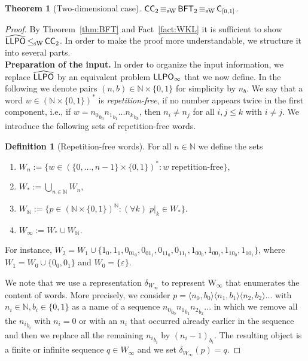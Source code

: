 \documentclass[a4paper]{amsart}
\def\IN{{\mathbb{N}}}
\def\LLPO{\text{\rm\sffamily LLPO}}
\def\BFT{\mbox{\rm\sffamily BFT}}
\def\C{\mbox{\rm\sffamily C}}
\def\ConC{\mbox{\rm\sffamily CC}}
\def\LLPO{\mbox{\rm\sffamily LLPO}}
\def\leqSW{\mathop{\leq_{\mathrm{sW}}}}
\def\equivSW{\mathop{\equiv_{\mathrm{sW}}}}
\newcommand{\W}{\mathrm{W}}
\newtheorem{theorem}{Theorem}[section]
\theoremstyle{definition}
\newtheorem{localdef}[localclaim]{Definition}
\begin{document}
\begin{theorem}[Two-dimensional case]
\label{thm:dim2}
$\ConC_2\equivSW\BFT_2\equivSW\C_{[0,1]}$.
\end{theorem}
\begin{proof}
By Theorem~\ref{thm:BFT} and Fact~\ref{fact:WKL} it is sufficient to show $\widehat{\LLPO}\leqSW\ConC_2$.
In order to make the proof more understandable, we structure it into several parts.\\

\noindent
{\bf Preparation of the input.}
In order to organize the input information, we replace $\widehat{\LLPO}$ by an equivalent problem $\LLPO_\infty$
that we now define.
In the following we denote pairs $(n,b)\in\IN\times\{0,1\}$ for simplicity by $n_b$.
We say that a word $w\in(\IN\times\{0,1\})^*$ is {\em repetition-free}, if 
no number appears twice in the first component, i.e., if $w={n_0}_{b_0}{n_1}_{b_1}...{n_k}_{b_k}$, then 
$n_i\not=n_j$ for all $i,j\leq k$ with $i\not=j$. We introduce the following sets of repetition-free words.
 
\begin{localdef}[Repetition-free words]
For all $n\in\IN$ we define the sets
\begin{enumerate}
\item $W_n:=\{w\in(\{0,...,n-1\}\times\{0,1\})^*:w$ repetition-free$\}$,
\item $W_*:=\bigcup_{n\in\IN}W_n$,
\item $W_\IN:=\{p\in(\IN\times\{0,1\})^\IN:(\forall k)\;p|_k\in W_*\}$.
\item $W_\infty:=W_*\cup W_\IN$.
\end{enumerate}
\end{localdef}

For instance, $W_2=W_1\cup\{1_0,1_1,0_01_0,0_01_1,0_11_0,0_11_1,1_00_0,1_00_1,1_10_0,1_10_1\}$,
where $W_1=W_0\cup\{0_0,0_1\}$ and $W_0=\{\varepsilon\}$. 

We note that we use a representation $\delta_{W_\infty}$ to represent $\W_\infty$ that enumerates
the content of words. More precisely, we consider $p=\langle n_0,b_0\rangle\langle n_1,b_1\rangle\langle n_2,b_2\rangle...$
with $n_i\in\IN, b_i\in\{0,1\}$ as a name of a sequence ${n_0}_{b_0}{n_1}_{b_1}{n_2}_{b_2}...$
in which we remove all the ${n_i}_{b_i}$ with $n_i=0$ or with an $n_i$ that occurred already earlier in the sequence
and then we replace all the remaining ${n_i}_{b_i}$ by ${(n_i-1)}_{b_i}$. The resulting object is a finite
or infinite sequence $q\in W_\infty$ and we set $\delta_{W_\infty}(p)=q$.


\end{proof}
\end{document}
